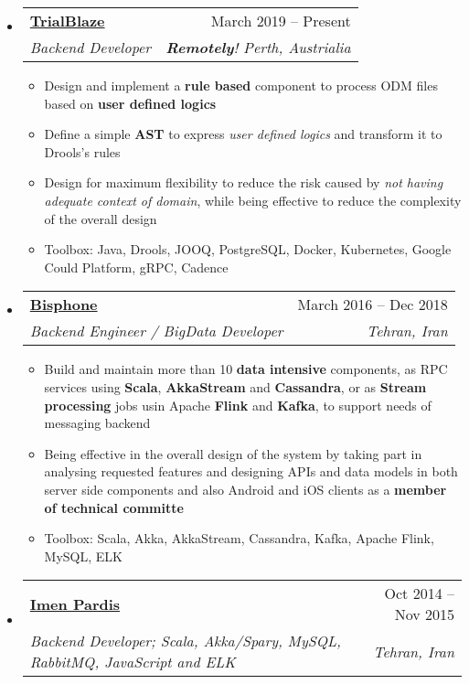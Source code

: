 \documentclass[letterpaper,12pt]{article}[leftmargin=*]
\makeatletter
\def \entryspacing {-0pt}
\newcommand{\resumeEntryStart}{\begin{itemize}[leftmargin=2.5mm]}
\newcommand{\resumeEntryEnd}{\end{itemize}\vspace{\entryspacing}}
\newcommand{\resumeItemListStart}{\begin{itemize}[leftmargin=4.5mm]}
\newcommand{\resumeItemListEnd}{\end{itemize}}
\newcommand{\resumeItem}[1]{
  \item\small{
    {#1 \vspace{-2pt}}
  }
}
\newcommand{\resumeEntryTSDL}[4]{
  \vspace{-1pt}\item[]
    \begin{tabular*}{0.97\textwidth}{l@{\extracolsep{\fill}}r}
      \textbf{\color{primary}#1} & {\firabook\color{accent}\small#2} \\
      \textit{\color{accent}\small#3} & \textit{\color{accent}\small#4} \\
    \end{tabular*}\vspace{-6pt}
}
\makeatother
\begin{document}
  \resumeEntryStart
    \resumeEntryTSDL
      {\href{https://trialblaze.com}{TrialBlaze}}{March 2019 -- Present}
      {Backend Developer}{\textbf{Remotely}! Perth, Austrialia}
    \resumeItemListStart
	  \resumeItem { Design and implement a \textbf{rule based} component to process ODM files based on \textbf{user defined logics}}
      \resumeItem{Define a simple \textbf{AST} to express \textit{user defined logics} and transform it to Drools's rules}
      \resumeItem{Design for maximum flexibility to reduce the risk caused by \textit{not having adequate context of domain}, while being effective to reduce the complexity of the overall design}
      \resumeItem{Toolbox: Java, Drools, JOOQ, PostgreSQL, Docker, Kubernetes, Google Could Platform, gRPC, Cadence}
    \resumeItemListEnd
  \resumeEntryEnd


  \resumeEntryStart
    \resumeEntryTSDL
      {\href{http://bisphone.com}{Bisphone}}{March 2016 -- Dec 2018}
      {Backend Engineer / BigData Developer}{Tehran, Iran}
    \resumeItemListStart
      \resumeItem{Build and maintain more than 10 \textbf{data intensive} components, as RPC services using \textbf{Scala}, \textbf{AkkaStream} and \textbf{Cassandra}, or as \textbf{Stream processing} jobs usin Apache \textbf{Flink} and \textbf{Kafka}, to support needs of messaging backend}
      \resumeItem{Being effective in the overall design of the system by taking part in analysing requested features and designing APIs and data models in both server side components and also Android and iOS clients as a \textbf{member of technical committe}}
      \resumeItem{Toolbox: Scala, Akka, AkkaStream, Cassandra, Kafka, Apache Flink, MySQL, ELK}
    \resumeItemListEnd
  \resumeEntryEnd


  \resumeEntryStart
    \resumeEntryTSDL
	  {\href{https://imenpardis.com/fa/}{Imen Pardis}}{Oct 2014 -- Nov 2015}
      {Backend Developer; Scala, Akka/Spary, MySQL, RabbitMQ, JavaScript and ELK}{Tehran, Iran}
  \resumeEntryEnd
\end{document}
